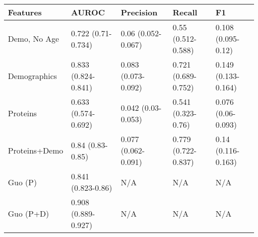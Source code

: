 \begin{tabular}{lllll}
\toprule
Features & AUROC & Precision & Recall & F1 \\
\midrule
Demo, No Age & 0.722 (0.71-0.734) & 0.06 (0.052-0.067) & 0.55 (0.512-0.588) & 0.108 (0.095-0.12) \\
Demographics & 0.833 (0.824-0.841) & 0.083 (0.073-0.092) & 0.721 (0.689-0.752) & 0.149 (0.133-0.164) \\
Proteins & 0.633 (0.574-0.692) & 0.042 (0.03-0.053) & 0.541 (0.323-0.76) & 0.076 (0.06-0.093) \\
Proteins+Demo & 0.84 (0.83-0.85) & 0.077 (0.062-0.091) & 0.779 (0.722-0.837) & 0.14 (0.116-0.163) \\
Guo (P) & 0.841 (0.823-0.86) & N/A & N/A & N/A \\
Guo (P+D) & 0.908 (0.889-0.927) & N/A & N/A & N/A \\
\bottomrule
\end{tabular}
